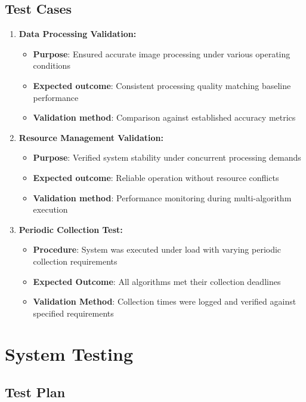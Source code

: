 \subsection{Test Cases}\label{subsec:test-cases}

\begin{enumerate}
\item \textbf{Data Processing Validation:}
   \begin{itemize}
   \item \textbf{Purpose}: Ensured accurate image processing under various operating conditions
   \item \textbf{Expected outcome}: Consistent processing quality matching baseline performance
   \item \textbf{Validation method}: Comparison against established accuracy metrics
   \end{itemize}

\item \textbf{Resource Management Validation:}
   \begin{itemize}
   \item \textbf{Purpose}: Verified system stability under concurrent processing demands
   \item \textbf{Expected outcome}: Reliable operation without resource conflicts
   \item \textbf{Validation method}: Performance monitoring during multi-algorithm execution
   \end{itemize}

\item \textbf{Periodic Collection Test:}
   \begin{itemize}
   \item \textbf{Procedure}: System was executed under load with varying periodic collection requirements
   \item \textbf{Expected Outcome}: All algorithms met their collection deadlines
   \item \textbf{Validation Method}: Collection times were logged and verified against specified requirements
   \end{itemize}
\end{enumerate}

\section{System Testing}\label{sec:system-testing}

\subsection{Test Plan}\label{subsec:test-plan}

